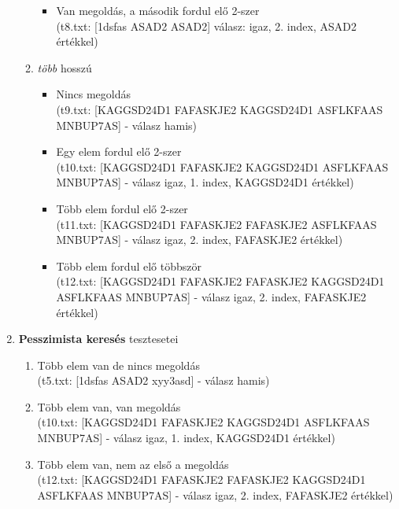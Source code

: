 \documentclass[12pt,a4paper]{article}			%
\begin{document}
\begin{enumerate}
\begin{enumerate}
\begin{itemize}[label={}]
					\item Van megoldás, a második fordul elő 2-szer\\
					(t8.txt: [1dsfas ASAD2 ASAD2] válasz: igaz, 2. index, ASAD2 értékkel)
				\end{itemize}
				\item \textit{több} hosszú
				\begin{itemize}[label={}]
					\item Nincs megoldás\\
					(t9.txt: [KAGGSD24D1 FAFASKJE2  KAGGSD24D1 ASFLKFAAS MNBUP7AS] - válasz hamis)
					\item Egy elem fordul elő 2-szer\\
					(t10.txt: [KAGGSD24D1 FAFASKJE2  KAGGSD24D1 ASFLKFAAS MNBUP7AS] - válasz igaz, 1. index, KAGGSD24D1 értékkel)
					\item Több elem fordul elő 2-szer\\
					(t11.txt: [KAGGSD24D1 FAFASKJE2 FAFASKJE2 ASFLKFAAS MNBUP7AS] - válasz igaz, 2. index, FAFASKJE2 értékkel)
					\item Több elem fordul elő többször\\
					(t12.txt: [KAGGSD24D1 FAFASKJE2 FAFASKJE2 KAGGSD24D1 ASFLKFAAS MNBUP7AS] - válasz igaz, 2. index, FAFASKJE2 értékkel)
				\end{itemize}
			\end{enumerate}
			\item \textbf{Pesszimista keresés} tesztesetei
				\begin{enumerate}
					\item Több  elem van de nincs megoldás\\
					(t5.txt: [1dsfas ASAD2 xyy3asd] - válasz hamis)
					\item Több elem van, van megoldás\\
					(t10.txt: [KAGGSD24D1 FAFASKJE2  KAGGSD24D1 ASFLKFAAS MNBUP7AS] - válasz igaz, 1. index, KAGGSD24D1 értékkel)
					\item Több elem van, nem az első a megoldás\\
					(t12.txt: [KAGGSD24D1 FAFASKJE2 FAFASKJE2 KAGGSD24D1 ASFLKFAAS MNBUP7AS] - válasz igaz, 2. index, FAFASKJE2 értékkel)
				\end{enumerate}
		\end{enumerate}
\end{document}
